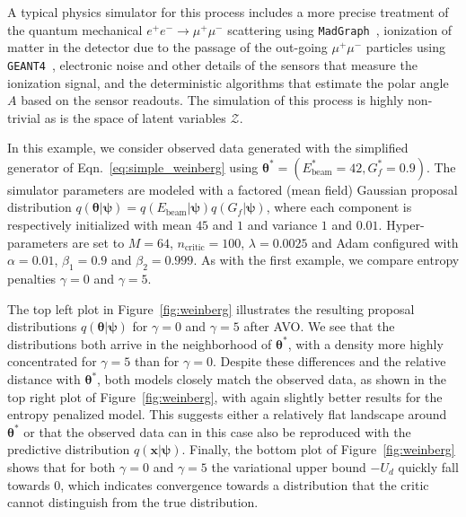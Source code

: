 \documentclass{article}
\newcommand{\qxpsi}{q(\mathbf{x}|\bfpsi)}
\newcommand{\bftheta}{{\bm \theta}}
\newcommand{\bfpsi}{{\bm \psi}}
\theoremstyle{plain}
\begin{document}
A typical physics simulator for this process includes a more precise treatment of the
quantum mechanical  $e^+e^- \rightarrow \mu^+\mu^-$ scattering
using \texttt{MadGraph}~\cite{Alwall:2011uj},  ionization of matter in the
detector due to the passage of the out-going $\mu^+\mu^-$ particles using
\texttt{GEANT4}~\cite{Agostinelli:2002hh}, electronic noise and other details of the sensors
that measure the ionization signal, and the deterministic algorithms that
estimate the polar angle $A$ based on the sensor readouts. The simulation of
this process is highly non-trivial as is the space of latent variables $\mathcal{Z}$.

In this example, we consider observed data generated with the simplified generator of Eqn.~\ref{eq:simple_weinberg}
using $\bftheta^* = (E_\text{beam}^*=42, G_f^*=0.9)$. The simulator parameters are modeled with a
factored (mean field) Gaussian proposal distribution $q(\bftheta|\bfpsi) = q(E_\text{beam}|\bfpsi)
q(G_f|\bfpsi)$, where each component is respectively initialized with mean $45$
and $1$ and variance $1$ and $0.01$. Hyper-parameters are set to $M=64$,
$n_\text{critic}=100$, $\lambda=0.0025$ and Adam configured with $\alpha=0.01$,
$\beta_1=0.9$ and $\beta_2=0.999$. As with the first example, we compare
entropy penalties $\gamma=0$ and $\gamma=5$.

The top left plot in Figure~\ref{fig:weinberg} illustrates the resulting
proposal distributions $q(\bftheta|\bfpsi)$ for $\gamma=0$ and $\gamma=5$ after
AVO. We see that the distributions both arrive
in the neighborhood of $\bftheta^*$, with a density  more highly concentrated for
$\gamma=5$ than for $\gamma=0$.  Despite these differences and the relative
distance with $\bftheta^*$, both models closely match the observed data, as shown
in the top right plot of  Figure~\ref{fig:weinberg}, with again slightly better
results for the entropy penalized model. This suggests either a relatively flat
landscape around $\bftheta^*$ or that the observed data can in this case also be
reproduced with the  predictive distribution $\qxpsi$.
Finally, the bottom plot of Figure~\ref{fig:weinberg} shows that for both
$\gamma=0$ and $\gamma=5$ the variational upper bound $-U_d$ quickly fall
towards $0$, which indicates  convergence towards a distribution that the critic
cannot distinguish from the true distribution.
\end{document}
